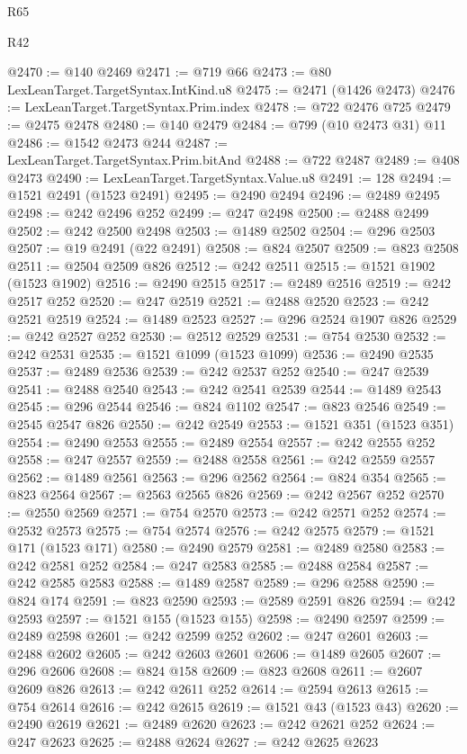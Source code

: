 \begin{lexlean}{R65}
\begin{lexlean}{R42}
\begin{coremodule}
{{{{{{{{{{{{{{{{{{{{{{{{{{{{{{{{{{{{{{{{{{{{{{{{{{{{{{{{{{{{{{{{{{{{{{{{{{{{{{{{{{{{{{{{{{{{{{{{{{{{{{{{{{{{{{{{{{{{{{{{{{{{{{{{{{{{{{{{{{{{{{{{{{{{{{{{{{{{{{{{{{{{{{{{{{{{{{{{{{{{{{{{@2470 := @140 @2469
@2471 := @719 @66
@2473 := @80 LexLeanTarget.TargetSyntax.IntKind.u8
@2475 := @2471 (@1426 @2473)
@2476 := LexLeanTarget.TargetSyntax.Prim.index
@2478 := @722 @2476 @725
@2479 := @2475 @2478
@2480 := @140 @2479
@2484 := @799 (@10 @2473 @31) @11
@2486 := @1542 @2473 @244
@2487 := LexLeanTarget.TargetSyntax.Prim.bitAnd
@2488 := @722 @2487
@2489 := @408 @2473
@2490 := LexLeanTarget.TargetSyntax.Value.u8
@2491 := 128
@2494 := @1521 @2491 (@1523 @2491)
@2495 := @2490 @2494
@2496 := @2489 @2495
@2498 := @242 @2496 @252
@2499 := @247 @2498
@2500 := @2488 @2499
@2502 := @242 @2500 @2498
@2503 := @1489 @2502
@2504 := @296 @2503
@2507 := @19 @2491 (@22 @2491)
@2508 := @824 @2507
@2509 := @823 @2508
@2511 := @2504 @2509 @826
@2512 := @242 @2511
@2515 := @1521 @1902 (@1523 @1902)
@2516 := @2490 @2515
@2517 := @2489 @2516
@2519 := @242 @2517 @252
@2520 := @247 @2519
@2521 := @2488 @2520
@2523 := @242 @2521 @2519
@2524 := @1489 @2523
@2527 := @296 @2524 @1907 @826
@2529 := @242 @2527 @252
@2530 := @2512 @2529
@2531 := @754 @2530
@2532 := @242 @2531
@2535 := @1521 @1099 (@1523 @1099)
@2536 := @2490 @2535
@2537 := @2489 @2536
@2539 := @242 @2537 @252
@2540 := @247 @2539
@2541 := @2488 @2540
@2543 := @242 @2541 @2539
@2544 := @1489 @2543
@2545 := @296 @2544
@2546 := @824 @1102
@2547 := @823 @2546
@2549 := @2545 @2547 @826
@2550 := @242 @2549
@2553 := @1521 @351 (@1523 @351)
@2554 := @2490 @2553
@2555 := @2489 @2554
@2557 := @242 @2555 @252
@2558 := @247 @2557
@2559 := @2488 @2558
@2561 := @242 @2559 @2557
@2562 := @1489 @2561
@2563 := @296 @2562
@2564 := @824 @354
@2565 := @823 @2564
@2567 := @2563 @2565 @826
@2569 := @242 @2567 @252
@2570 := @2550 @2569
@2571 := @754 @2570
@2573 := @242 @2571 @252
@2574 := @2532 @2573
@2575 := @754 @2574
@2576 := @242 @2575
@2579 := @1521 @171 (@1523 @171)
@2580 := @2490 @2579
@2581 := @2489 @2580
@2583 := @242 @2581 @252
@2584 := @247 @2583
@2585 := @2488 @2584
@2587 := @242 @2585 @2583
@2588 := @1489 @2587
@2589 := @296 @2588
@2590 := @824 @174
@2591 := @823 @2590
@2593 := @2589 @2591 @826
@2594 := @242 @2593
@2597 := @1521 @155 (@1523 @155)
@2598 := @2490 @2597
@2599 := @2489 @2598
@2601 := @242 @2599 @252
@2602 := @247 @2601
@2603 := @2488 @2602
@2605 := @242 @2603 @2601
@2606 := @1489 @2605
@2607 := @296 @2606
@2608 := @824 @158
@2609 := @823 @2608
@2611 := @2607 @2609 @826
@2613 := @242 @2611 @252
@2614 := @2594 @2613
@2615 := @754 @2614
@2616 := @242 @2615
@2619 := @1521 @43 (@1523 @43)
@2620 := @2490 @2619
@2621 := @2489 @2620
@2623 := @242 @2621 @252
@2624 := @247 @2623
@2625 := @2488 @2624
@2627 := @242 @2625 @2623
}}}}}}}}}}}}}}}}}}}}}}}}}}}}}}}}}}}}}}}}}}}}}}}}}}}}}}}}}}}}}}}}}}}}}}}}}}}}}}}}}}}}}}}}}}}}}}}}}}}}}}}}}}}}}}}}}}}}}}}}}}}}}}}}}}}}}}}}}}}}}}}}}}}}}}}}}}}}}}}}}}}}}}}}}}}}}}}}}}}}}}}}
\end{coremodule}
\end{lexlean}
\end{lexlean}
